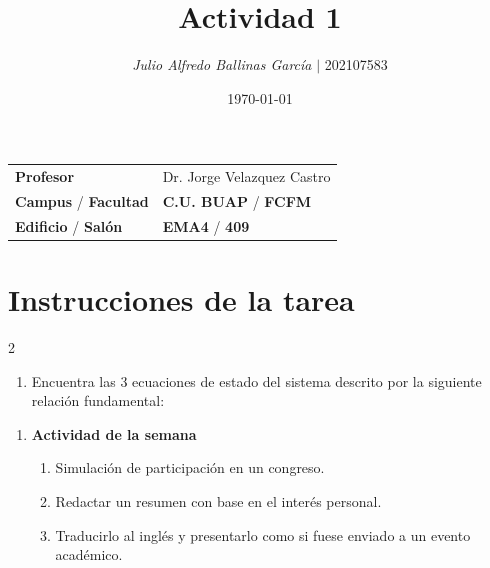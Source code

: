 \documentclass{article}
\title{\textcolor{Apple Green}{\textbf{Actividad 1}}}
\author{\emph{Julio Alfredo Ballinas García} $\boldsymbol{\mid}$ 202107583}
\date{\today}
\begin{document}
\maketitle



\begin{mybox}
\noindent\begin{tabular}{@{}ll}
	{\bfseries{Profesor}} & Dr. Jorge Velazquez Castro\\
	\textcolor{prussianblue}{\bfseries{Campus}} / \textcolor{trueblue}{\bfseries{Facultad}}  & \textcolor{prussianblue}{\bfseries{C.U. BUAP}} /  \textcolor{trueblue}{\bfseries{FCFM}} \\
	\textcolor{prussianblue}{\bfseries{Edificio}} /  \textcolor{trueblue}{\bfseries{Salón}}    & 	\textcolor{prussianblue}{\bfseries{EMA4}} /  \textcolor{trueblue}{\bfseries{409}}   
\end{tabular} 
\end{mybox} \vspace{1cm}

\section{Instrucciones de la tarea}

\setlength{\columnsep}{2cm}
\begin{multicols}{2}

    \begin{enumerate}[label={{\textcolor{trueblue}{\textbf{Ej}. \arabic*.0}}}, start=1]
        \item Encuentra las 3 ecuaciones de estado del sistema descrito por la siguiente relación fundamental:
     \[    \]
    \end{enumerate}

    \begin{enumerate}[label={{\textcolor{trueblue}{\textbf{Ej}. \arabic*.0}}}, start=2]
        \item \textbf{Actividad de la semana}
        \begin{enumerate}
            \item Simulación de participación en un congreso.
            \item Redactar un resumen con base en el interés personal.
            \item Traducirlo al inglés y presentarlo como si fuese enviado a un evento académico.
        \end{enumerate}
    \end{enumerate}

\end{multicols}
\end{document}
